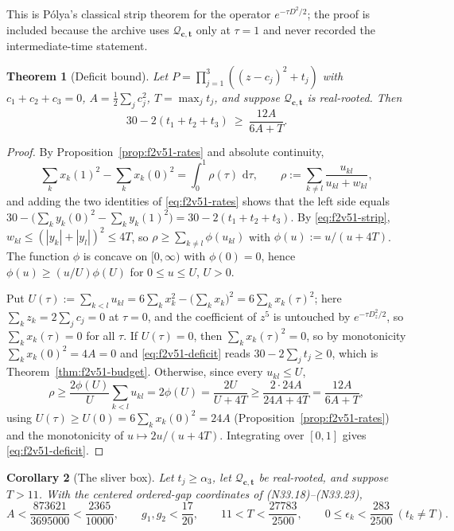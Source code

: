 \documentclass[11pt]{article}
\newtheorem{theorem}{Theorem}[section]
\newtheorem{corollary}[theorem]{Corollary}
\theoremstyle{definition}
\theoremstyle{remark}
\newcommand{\dd}{\,\mathrm d}
\begin{document}
This is P\'{o}lya's classical strip theorem for the operator
\(e^{-\tau D^2/2}\); the proof is included because the archive uses
\(\mathcal Q_{\bm c,\bm t}\) only at \(\tau=1\) and never recorded the
intermediate-time statement.

\begin{theorem}[Deficit bound]
\label{thm:f2v51-deficit}
Let \(P=\prod_{j=1}^3((z-c_j)^2+t_j)\) with \(c_1+c_2+c_3=0\),
\(A=\tfrac12\sum_jc_j^2\), \(T=\max_jt_j\), and suppose
\(\mathcal Q_{\bm c,\bm t}\) is real-rooted.  Then
\begin{equation}
 \boxed{30-2(t_1+t_2+t_3)\ \ge\ \frac{12A}{6A+T}.}
 \label{eq:f2v51-deficit}
\end{equation}
\end{theorem}

\begin{proof}
By Proposition~\ref{prop:f2v51-rates} and absolute continuity,
\begin{equation}
 \sum_kx_k(1)^2-\sum_kx_k(0)^2
 =\int_0^1\rho(\tau)\,\dd\tau,
 \qquad
 \rho:=\sum_{k\ne l}\frac{u_{kl}}{u_{kl}+w_{kl}},
 \label{eq:f2v51-deficit-integral}
\end{equation}
and adding the two identities of \eqref{eq:f2v51-rates} shows that the
left side equals \(30-\bigl(\sum_ky_k(0)^2-\sum_ky_k(1)^2\bigr)
 =30-2(t_1+t_2+t_3)\).  By \eqref{eq:f2v51-strip},
\(w_{kl}\le(|y_k|+|y_l|)^2\le4T\), so
\(\rho\ge\sum_{k\ne l}\phi(u_{kl})\) with \(\phi(u):=u/(u+4T)\).  The
function \(\phi\) is concave on \([0,\infty)\) with \(\phi(0)=0\), hence
\(\phi(u)\ge(u/U)\phi(U)\) for \(0\le u\le U\), \(U>0\).

Put \(U(\tau):=\sum_{k<l}u_{kl}=6\sum_kx_k^2-\bigl(\sum_kx_k\bigr)^2
 =6\sum_kx_k(\tau)^2\); here \(\sum_kz_k=2\sum_jc_j=0\) at \(\tau=0\), and
the coefficient of \(z^5\) is untouched by \(e^{-\tau D_z^2/2}\), so
\(\sum_kx_k(\tau)=0\) for all \(\tau\).  If \(U(\tau)=0\), then
\(\sum_kx_k(\tau)^2=0\), so by monotonicity \(\sum_kx_k(0)^2=4A=0\) and
\eqref{eq:f2v51-deficit} reads \(30-2\sum_jt_j\ge0\), which is
Theorem~\ref{thm:f2v51-budget}.  Otherwise, since every
\(u_{kl}\le U\),
\[
 \rho\ge\frac{2\phi(U)}{U}\sum_{k<l}u_{kl}=2\phi(U)
 =\frac{2U}{U+4T}\ge\frac{2\cdot24A}{24A+4T}=\frac{12A}{6A+T},
\]
using \(U(\tau)\ge U(0)=6\sum_kx_k(0)^2=24A\)
(Proposition~\ref{prop:f2v51-rates}) and the monotonicity of
\(u\mapsto2u/(u+4T)\).  Integrating over \([0,1]\) gives
\eqref{eq:f2v51-deficit}.
\end{proof}

\begin{corollary}[The sliver box]
\label{cor:f2v51-sliver}
Let \(t_j\ge\alpha_3\), let \(\mathcal Q_{\bm c,\bm t}\) be real-rooted,
and suppose \(T>11\).  With the centered ordered-gap coordinates of
\textup{(N33.18)}--\textup{(N33.23)},
\begin{equation}
 \boxed{
 A<\frac{873621}{3695000}<\frac{2365}{10000},\qquad
 g_1,g_2<\frac{17}{20},\qquad
 11<T<\frac{27783}{2500},\qquad
 0\le\epsilon_k<\frac{283}{2500}\ (t_k\ne T).}
 \label{eq:f2v51-sliver}
\end{equation}
\end{corollary}
\end{document}
